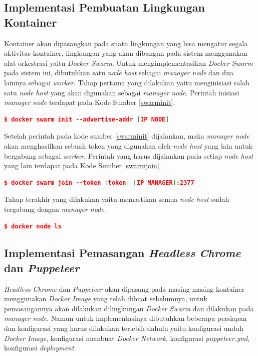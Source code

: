 		\subsection{Implementasi Pembuatan Lingkungan Kontainer}
			Kontainer akan dipasangkan pada suatu lingkungan yang bisa mengatur segala aktivitas kontainer, lingkungan yang akan dibangun pada sistem menggunakan alat orkestrasi yaitu \textit{Docker Swarm}. Untuk mengimplementasikan \textit{Docker Swarm} pada sistem ini, dibutuhkan satu \textit{node host} sebagai \textit{manager node} dan dua lainnya sebagai \textit{worker}. Tahap pertama yang dilakukan yaitu menginisiasi salah satu \textit{node host} yang akan digunakan sebagai \textit{manager node}. Perintah inisiasi \textit{manager node} terdapat pada Kode Sumber \ref{swarminit}.
			\begin{lstlisting}[frame=single,tabsize=2,breaklines,caption={Perintah untuk inisiasi \textit{manager node}},label=swarminit, captionpos=b, language=json,numbers=none]
	$ docker swarm init --advertise-addr [IP NODE]
			\end{lstlisting}
			
			Setelah perintah pada kode sumber \ref{swarminit} dijalankan, maka \textit{manager node} akan menghasilkan sebuah token yang digunakan oleh \textit{node host} yang lain untuk bergabung sebagai \textit{worker}. Perintah yang harus dijalankan pada setiap \textit{node host} yang lain terdapat pada Kode Sumber \ref{swarmjoin}.
			\begin{lstlisting}[frame=single,tabsize=2,breaklines,caption={Perintah untuk bergabung ke \textit{Swarm}},label=swarmjoin, captionpos=b, language=json,numbers=none]
	$ docker swarm join --token [token] [IP MANAGER]:2377
			\end{lstlisting}
			
			Tahap terakhir yang dilakukan yaitu memastikan semua \textit{node host} sudah tergabung dengan \textit{manager node}.
			\begin{lstlisting}[frame=single,tabsize=2,breaklines,caption={Perintah untuk melihat daftar \textit{Swarm Node}},label=dockernodels, captionpos=b, language=json,numbers=none]
	$ docker node ls
			\end{lstlisting}
			
		\subsection{Implementasi Pemasangan \textit{Headless Chrome} dan \textit{Puppeteer}}
			\textit{Headless Chrome} dan \textit{Puppeteer} akan dipasang pada masing-masing kontainer menggunakan \textit{Docker Image} yang telah dibuat sebelumnya, untuk pemasangannya akan dilakukan dilingkungan \textit{Docker Swarm} dan dilakukan pada \textit{manager node}. Namun untuk implementasinya dibutuhkan beberapa persiapan dan konfigurasi yang harus dilakukan terlebih dahulu yaitu konfigurasi unduh \textit{Docker Image}, konfigurasi membuat \textit{Docker Network}, konfigurasi \textit{puppeteer.yml}, konfigurasi \textit{deployment}.
			
